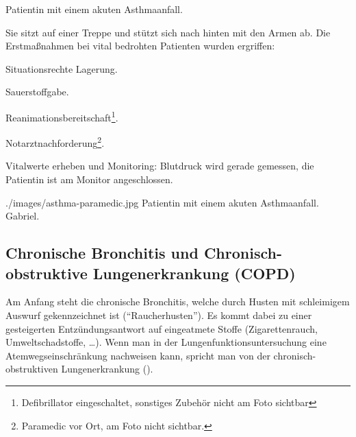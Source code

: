 {
Patientin mit einem akuten Asthmaanfall.

Sie sitzt auf einer Treppe und stützt sich nach hinten
mit den Armen ab. Die Erstmaßnahmen bei vital bedrohten Patienten wurden ergriffen:
\begin{compactitem}
  \item Situationsrechte Lagerung.
  \item Sauerstoffgabe.
  \item Reanimationsbereitschaft\footnote{Defibrillator eingeschaltet,
  sonstiges Zubehör nicht am Foto sichtbar}.
  \item Notarztnachforderung\footnote{Paramedic
  vor Ort, am Foto nicht sichtbar.}.
  \item Vitalwerte erheben und Monitoring:
  Blutdruck wird gerade gemessen, die Patientin
  ist am Monitor angeschlossen.
\end{compactitem}
}{

}
{./images/asthma-paramedic.jpg}
{Patientin mit einem akuten Asthmaanfall.\label{fig:asthma-paramedic}}
{Gabriel.}





\subsection{Chronische Bronchitis und 
Chronisch-obstruktive Lungenerkrankung
(COPD)}
\label{topic:copd}
\nocite{Renz-Polster2006} 


\emph{ }


Am Anfang steht die chronische Bronchitis, welche durch
Husten mit schleimigem Auswurf gekennzeichnet ist
("`Raucherhusten"'). Es kommt dabei zu einer gesteigerten
Entzündungsantwort auf eingeatmete Stoffe (Zigarettenrauch,
Umweltschadstoffe, \ldots). Wenn man in der
Lungenfunktionsuntersuchung eine Atemwegseinschränkung
nachweisen kann, spricht man von der chronisch-obstruktiven
Lungenerkrankung (). 


